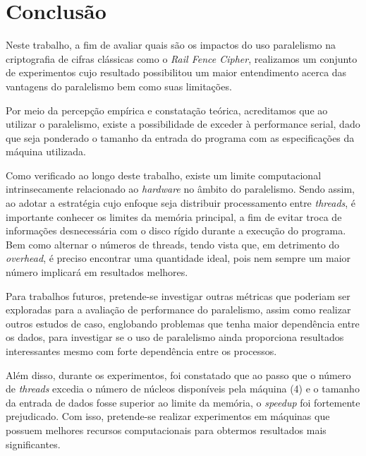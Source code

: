 \documentclass[letterpaper, 10 pt, conference]{ieeeconf}  %
\begin{document}
\section{Conclusão}
Neste trabalho, a fim de avaliar quais são os impactos do uso paralelismo na criptografia de cifras clássicas como o \textit{Rail Fence Cipher}, realizamos um conjunto de experimentos cujo resultado possibilitou um maior entendimento acerca das vantagens do paralelismo bem como suas limitações. 

Por meio da percepção empírica e constatação teórica, acreditamos que ao utilizar o paralelismo, existe a possibilidade de exceder à performance serial, dado que seja ponderado o tamanho da entrada do programa com as especificações da máquina utilizada. 

Como verificado ao longo deste trabalho, existe um limite computacional intrinsecamente relacionado ao \textit{hardware} no âmbito do paralelismo. Sendo assim, ao adotar a estratégia cujo enfoque seja distribuir processamento entre \textit{threads}, é importante conhecer os limites da memória principal, a fim de evitar troca de informações desnecessária com o disco rígido durante a execução do programa. Bem como alternar o números de threads, tendo vista que, em detrimento do \textit{overhead}, é preciso encontrar uma quantidade ideal, pois nem sempre um maior número implicará em resultados melhores.

Para trabalhos futuros, pretende-se investigar outras métricas que poderiam ser exploradas para a avaliação de performance do paralelismo, assim como realizar outros estudos de caso, englobando problemas que tenha maior dependência entre os dados, para investigar se o uso de paralelismo ainda proporciona resultados interessantes mesmo com forte dependência entre os processos. 

Além disso, durante os experimentos, foi constatado que ao passo que o número de \textit{threads} excedia o número de núcleos disponíveis pela máquina (4) e o tamanho da entrada de dados fosse superior ao limite da memória, o \textit{speedup} foi fortemente prejudicado. Com isso, pretende-se realizar experimentos em máquinas que possuem melhores recursos computacionais para obtermos resultados mais significantes.
\end{document}
